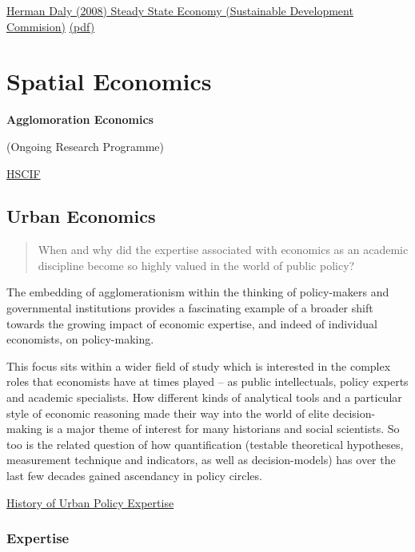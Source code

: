 \documentclass[
]{book}
\begin{document}
\href{http://\%20www.sd-commission.org.uk/publications.php@id=775.html}{Herman Daly (2008) Steady State Economy (Sustainable Development Commision)}
\href{pdf/Daly_2008_Steady_State_Economy_SD_Commision.pdf}{(pdf)}

\hypertarget{spatial-economics}{%
\chapter{Spatial Economics}\label{spatial-economics}}

\textbf{Agglomoration Economics}

(Ongoing Research Programme)

\href{https://hscif.org/portfolio/agglomeration-economics/}{HSCIF}

\hypertarget{urban-economics}{%
\section{Urban Economics}\label{urban-economics}}

\begin{quote}
When and why did the expertise associated with economics as an academic discipline
become so highly valued in the world of public policy?
\end{quote}

The embedding of agglomerationism within the thinking of policy-makers and governmental institutions provides a fascinating example of a broader shift towards the growing impact of economic expertise, and indeed of individual economists, on policy-making.

This focus sits within a wider field of study which is interested in the complex roles that economists have at times played -- as public intellectuals, policy experts and academic specialists. How different kinds of analytical tools and a particular style of economic reasoning made their way into the world of elite decision-making is a major theme of interest for many historians and social scientists. So too is the related question of how quantification (testable theoretical hypotheses, measurement technique and indicators, as well as decision-models) has over the last few decades gained ascendancy in policy circles.

\href{https://hscif.org/economists-in-the-city-intro/}{History of Urban Policy Expertise}

\hypertarget{expertise}{%
\subsection{Expertise}\label{expertise}}
\end{document}
